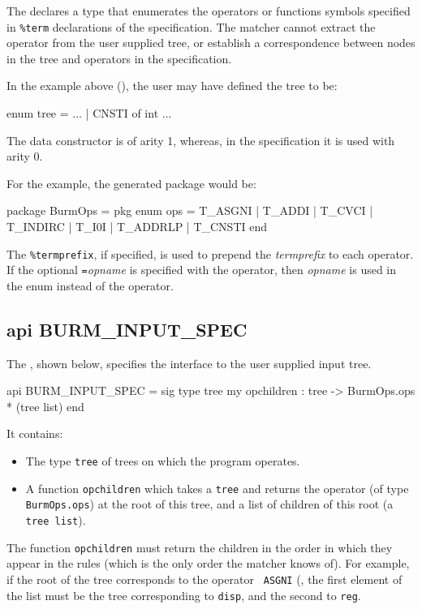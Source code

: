 The  declares a type  that enumerates
the operators or functions symbols specified in {\tt \%term}
declarations of the specification. The matcher cannot extract the
operator from the user supplied tree, or establish a correspondence
between nodes in the tree and operators in the specification.

In the example above (), the user may have
defined the tree to be:
\begin{code}
    enum tree = ...
                  | CNSTI of int
                  ...
\end{code}
The data constructor  is of arity 1, whereas, in the
specification it is used with arity 0.

For the example, the generated package would be:

\begin{code}
    package BurmOps = pkg
      enum ops = 
           T_ASGNI 
         | T_ADDI   
         | T_CVCI 
         | T_INDIRC
         | T_I0I   
         | T_ADDRLP 
         | T_CNSTI
    end
\end{code}

The {\tt \%termprefix}, if specified, is used to prepend the {\sl
termprefix} to each operator. If the optional {\sl {\tt =}opname} is
specified with the operator, then {\sl opname} is used in the
enum  instead of the operator.

	\subsection{api BURM\_INPUT\_SPEC}

The , shown below, specifies the
interface to the user supplied input tree.
\begin{code}
    api BURM_INPUT_SPEC = sig
      type tree
      my opchildren : tree -> BurmOps.ops * (tree list)
    end
\end{code}
It contains:
\begin{itemize}
 \item The type {\tt tree} of trees on which the program operates.

 \item A function {\tt opchildren} which takes a {\tt tree} and returns the
operator (of type {\tt BurmOps.ops}) at the root of this tree, and a list
of children of this root (a {\tt tree list}). 
\end{itemize}

The function {\tt opchildren} must return the children in the order in
which they appear in the rules (which is the only order the matcher knows
of).  For example, if the root of the tree corresponds to the operator {\tt
ASGNI} (, the first element of the list
must be the tree corresponding to {\tt disp}, and the second 
to {\tt reg}.



